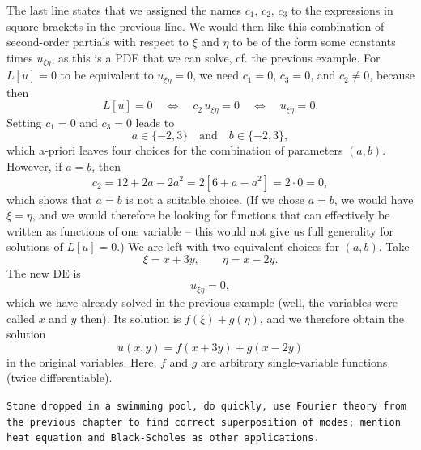 \begin{example}
\begin{equation*}
\end{equation*}
The last line states that we assigned the names $c_1,\,c_2,\,c_3$ to the expressions in square brackets in the previous line. We would then like this combination of second-order partials with respect to $\xi$ and $\eta$ to be of the form some constants times $u_{\xi\eta}$, as this is a PDE that we can solve, cf. the previous example. For $L[u]=0$ to be equivalent to $u_{\xi\eta}=0$, we need $c_1=0$, $c_3=0$, and $c_2\not=0$, because then
\[ L[u]=0 \quad \Longleftrightarrow \quad c_2\,u_{\xi\eta}=0
\quad \Longleftrightarrow \quad u_{\xi\eta}=0. \]
Setting $c_1=0$ and $c_3=0$ leads to
\[ a\in \{-2,3\} \quad \text{and} \quad b\in\{-2,3\},  \]
which a-priori leaves four choices for the combination of parameters $(a,b)$. However, if $a=b$, then
\[ c_2 = 12+2a-2a^2 = 2[6+a-a^2]=2 \cdot 0 = 0, \]
which shows that $a=b$ is not a suitable choice. (If we chose $a=b$, we would have $\xi=\eta$, and we would therefore be looking for functions that can effectively be written as functions of one variable -- this would not give us full generality for solutions of $L[u]=0$.) We are left with two equivalent choices for $(a,b)$. Take 
\[ \xi = x+3y, \qquad \eta = x-2y. \]
The new DE is
\[ u_{\xi\eta} = 0, \]
which we have already solved in the previous example (well, the variables were called $x$ and $y$ then). Its solution is $f(\xi)+g(\eta)$, and we therefore obtain the solution
\[ u(x,y) = f(x+3y)+g(x-2y) \]
in the original variables. Here, $f$ and $g$ are arbitrary single-variable functions (twice differentiable).
\end{example}

\begin{application}
\texttt{Stone dropped in a swimming pool, do quickly, use Fourier theory from the previous chapter to find correct superposition of modes; mention heat equation and Black-Scholes as other applications.}
\end{application}

